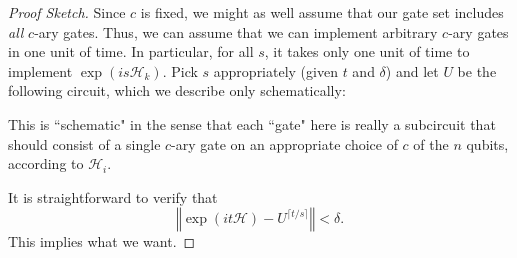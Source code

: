 \documentclass{article}
\begin{document}
\begin{proof}[Proof Sketch]
    Since $c$ is fixed, we might as well assume that our gate set includes \emph{all} $c$-ary gates.  Thus, we can assume that we can implement arbitrary $c$-ary gates in one unit of time. In particular, for all $s$, it takes only one unit of time to implement $\exp(is\mathcal H_k)$. Pick $s$ appropriately (given $t$ and $\delta$) and let $U$ be the following circuit, which we describe only schematically:

    \begin{center}
    \end{center}
This is ``schematic" in the sense that each ``gate" here is really a subcircuit that should consist of a single $c$-ary gate on an appropriate choice of $c$ of the $n$ qubits, according to $\mathcal{H}_i$.

    It is straightforward to verify that $$\left \Vert \exp(it\mathcal H) - U^{\lceil t/s\rceil}\right \Vert <\delta.$$
This implies what we want.
\end{proof}
\end{document}
